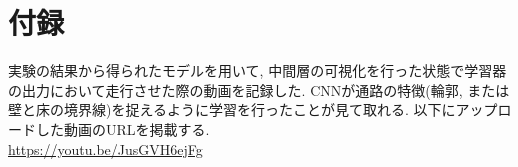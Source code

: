 \chapter*{付録}


実験の結果から得られたモデルを用いて, 中間層の可視化を行った状態で学習器の出力において走行させた際の動画を記録した. CNNが通路の特徴(輪郭, または壁と床の境界線)を捉えるように学習を行ったことが見て取れる. 以下にアップロードした動画のURLを掲載する.\\
\url{https://youtu.be/JusGVH6ejFg}